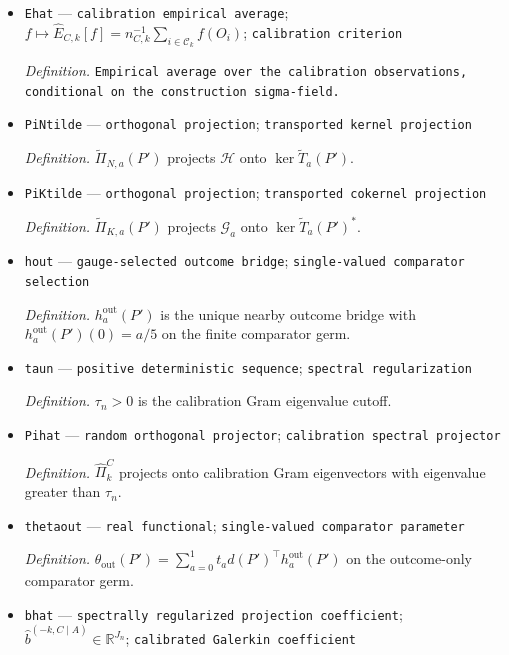 \documentclass{article}
\begin{document}
\begin{itemize}
  \item \texttt{Ehat} --- \texttt{calibration empirical average}; \(f\mapsto\widehat E_{C,k}[f]=n_{C,k}^{-1}\sum_{i\in\mathcal C_k}f(O_i)\); \texttt{calibration criterion}
  \par\smallskip\noindent\emph{Definition.} \texttt{Empirical average over the calibration observations,\allowbreak{} conditional on the construction sigma-\allowbreak{}field.}
  \item \texttt{PiNtilde} --- \texttt{orthogonal projection}; \texttt{transported kernel projection}
  \par\smallskip\noindent\emph{Definition.} \(\widetilde\Pi_{N,a}(P')\) projects \(\mathcal H\) onto \(\ker\widetilde T_a(P')\).
  \item \texttt{PiKtilde} --- \texttt{orthogonal projection}; \texttt{transported cokernel projection}
  \par\smallskip\noindent\emph{Definition.} \(\widetilde\Pi_{K,a}(P')\) projects \(\mathcal G_a\) onto \(\ker\widetilde T_a(P')^*\).
  \item \texttt{hout} --- \texttt{gauge-\allowbreak{}selected outcome bridge}; \texttt{single-\allowbreak{}valued comparator selection}
  \par\smallskip\noindent\emph{Definition.} \(h_a^{\mathrm{out}}(P')\) is the unique nearby outcome bridge with \(h_a^{\mathrm{out}}(P')(0)=a/5\) on the finite comparator germ.
  \item \texttt{taun} --- \texttt{positive deterministic sequence}; \texttt{spectral regularization}
  \par\smallskip\noindent\emph{Definition.} \(\tau_n>0\) is the calibration Gram eigenvalue cutoff.
  \item \texttt{Pihat} --- \texttt{random orthogonal projector}; \texttt{calibration spectral projector}
  \par\smallskip\noindent\emph{Definition.} \(\widehat\Pi_k^C\) projects onto calibration Gram eigenvectors with eigenvalue greater than \(\tau_n\).
  \item \texttt{thetaout} --- \texttt{real functional}; \texttt{single-\allowbreak{}valued comparator parameter}
  \par\smallskip\noindent\emph{Definition.} \(\theta_{\mathrm{out}}(P')=\sum_{a=0}^1t_a d(P')^\top h_a^{\mathrm{out}}(P')\) on the outcome-only comparator germ.
  \item \texttt{bhat} --- \texttt{spectrally regularized projection coefficient}; \(\widehat b^{(-k,C\mid A)}\in\mathbb R^{J_n}\); \texttt{calibrated Galerkin coefficient}

\end{itemize}
\end{document}
